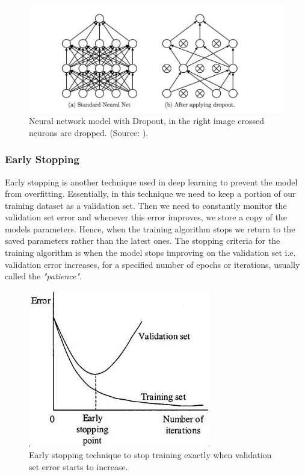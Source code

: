 \documentclass[a4paper, 12pt]{article}
\numberwithin{equation}{section}
\numberwithin{figure}{section}
\numberwithin{table}{section}
\begin{document}
	\begin{figure}[H]
		\centering
		\includegraphics[scale=0.35, keepaspectratio]{dropout.jpg}
		\caption[Neural network model with Dropout]{Neural network model with Dropout, in the right image crossed neurons are dropped. (Source: \cite{eff_backprop}).}
		\label{fig:dropout}
	\end{figure}

	\subsubsection{Early Stopping}
	
	Early stopping is another technique used in deep learning to prevent the model from overfitting. Essentially, in this technique we need to keep a portion of our training dataset as a validation set. Then we need to constantly monitor the validation set error and whenever this error improves, we store a copy of the models parameters. Hence, when the training algorithm stops we return to the saved parameters rather than the latest ones. The stopping criteria for the training algorithm is when the model stops improving on the validation set i.e. validation error increases, for a specified number of epochs or iterations, usually called the \textit{"patience"}.
	
	\begin{figure}[H]
		\centering
		\includegraphics[scale=0.7, keepaspectratio]{early_stopping.jpg}
		\caption[Early stopping]{Early stopping technique to stop training exactly when validation set error starts to increase.}

		\label{fig:early_stop}
	\end{figure}
	
\end{document}
